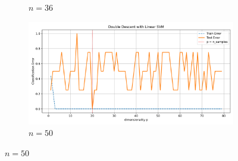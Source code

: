 \documentclass{article}
\begin{document}
\begin{figure}[htb]
\begin{subfigure}[b]{\imgwidth}
    \caption{$n=36$}\label{fig:2c1}
  \end{subfigure}%
  \hfill
  \begin{subfigure}[b]{\imgwidth}
    \includegraphics[width=\linewidth]{img_qq/risk_curve_n30.png}
    \caption{$n=50$}\label{fig:2d1}
  \end{subfigure}

  \medskip


\end{figure}
\end{document}
